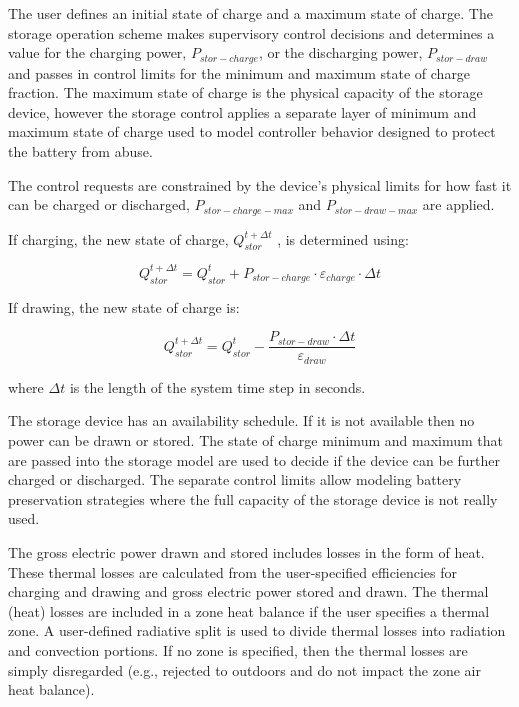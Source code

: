 The user defines an initial state of charge and a maximum state of charge. The storage operation scheme makes supervisory control decisions and determines a value for the charging power, ${P_{stor-charge}}$, or the discharging power, ${P_{stor-draw}}$ and passes in control limits for the minimum and maximum state of charge fraction.  The maximum state of charge is the physical capacity of the storage device, however the storage control applies a separate layer of minimum and maximum state of charge used to model controller behavior designed to protect the battery from abuse.

The control requests are constrained by the device's physical limits for how fast it can be charged or discharged, ${P_{stor-charge-max}}$ and ${P_{stor-draw-max}}$ are applied.

If charging, the new state of charge, \(Q_{stor}^{t + \Delta t}\) , is determined using:

\begin{equation}
Q_{stor}^{t + \Delta t} = Q_{stor}^t + {P_{stor-charge}} \cdot {\varepsilon_{charge}} \cdot \Delta t
\end{equation}

If drawing, the new state of charge is:

\begin{equation}
Q_{stor}^{t + \Delta t} = Q_{stor}^t - \frac{{{P_{stor - draw}} \cdot \Delta t}}{{{\varepsilon_{draw}}}}
\end{equation}

where \(\Delta t\) is the length of the system time step in seconds.

The storage device has an availability schedule. If it is not available then no power can be drawn or stored.  The state of charge minimum and maximum that are passed into the storage model are used to decide if the device can be further charged or discharged.  The separate control limits allow modeling battery preservation strategies where the full capacity of the storage device is not really used.

The gross electric power drawn and stored includes losses in the form of heat. These thermal losses are calculated from the user-specified efficiencies for charging and drawing and gross electric power stored and drawn. The thermal (heat) losses are included in a zone heat balance if the user specifies a thermal zone. A user-defined radiative split is used to divide thermal losses into radiation and convection portions. If no zone is specified, then the thermal losses are simply disregarded (e.g., rejected to outdoors and do not impact the zone air heat balance).

